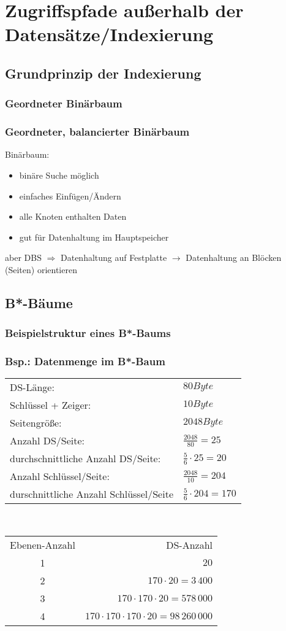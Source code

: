 \section{Zugriffspfade außerhalb der Datensätze/Indexierung}
\subsection{Grundprinzip der Indexierung}
\subsubsection{Geordneter Binärbaum}
\subsubsection{Geordneter, balancierter Binärbaum}
Binärbaum:
\begin{itemize}
\item binäre Suche möglich
\item einfaches Einfügen/Ändern
\item alle Knoten enthalten Daten
\item gut für Datenhaltung im Hauptspeicher
\end{itemize}
aber DBS $\Rightarrow$ Datenhaltung auf Festplatte $\to$ Datenhaltung an Blöcken (Seiten) orientieren
\subsection{B*-Bäume}
\subsubsection*{Beispielstruktur eines B*-Baums}
\subsubsection*{Bsp.: Datenmenge im B*-Baum}
\begin{tabular}{l l}
DS-Länge: & $80 \unit{Byte}$\\
Schlüssel + Zeiger: & $10 \unit{Byte}$\\
Seitengröße: & $2048 \unit{Byte}$\\
Anzahl DS/Seite: & $\tfrac{2048}{80} = 25$\\
durchschnittliche Anzahl DS/Seite: & $\tfrac{5}{6} \cdot 25 = \boxed{20}$\\
Anzahl Schlüssel/Seite: & $\tfrac{2048}{10} = 204$\\
durschnittliche Anzahl Schlüssel/Seite & $\tfrac{5}{6} \cdot 204 = \boxed{170}$
\end{tabular}\\
\begin{tabular}{c r}
Ebenen-Anzahl & DS-Anzahl\\
1 & $20$\\
2 & $170 \cdot 20 = 3\,400$\\
3 & $170 \cdot 170 \cdot 20 = 578\,000$\\
4 & $170 \cdot 170 \cdot 170  \cdot 20 = 98\,260\,000$
\end{tabular}

